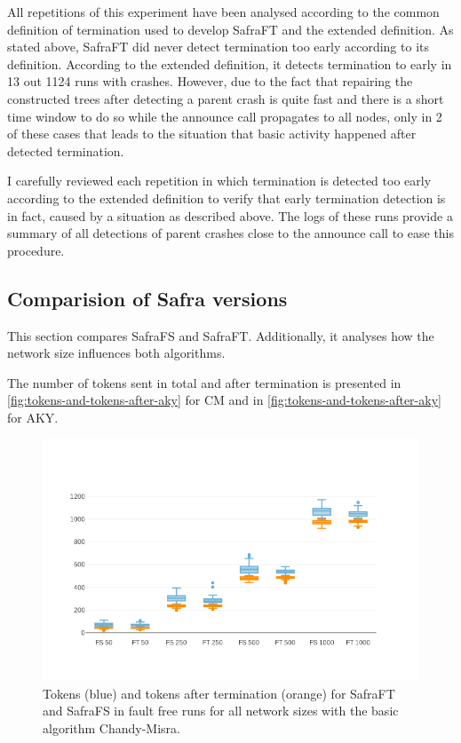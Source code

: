 All repetitions of this experiment have been analysed according to the common definition of termination used to develop SafraFT and the extended definition.
As stated above, SafraFT did never detect termination too early according to its definition.
According to the extended definition, it detects termination to early in 13 out 1124 runs with crashes.  %
However, due to the fact that repairing the constructed trees after detecting a parent crash is quite fast and there is a short time window to do so while the announce call propagates to all nodes, only in 2 of these cases that leads to the situation that basic activity happened after detected termination. %

I carefully reviewed each repetition in which termination is detected too early according to the extended definition to verify that early termination detection is in fact, caused by a situation as described above.
The logs of these runs provide a summary of all detections of parent crashes close to the announce call to ease this procedure.

\subsection{Comparision of Safra versions}
This section compares SafraFS and SafraFT.
Additionally, it analyses how the network size influences both algorithms.

The number of tokens sent in total and after termination is presented in \cref{fig:tokens-and-tokens-after-aky} for CM and in \cref{fig:tokens-and-tokens-after-aky} for AKY.

\begin{figure}
	\includegraphics{figures/tokens-cm.png}
	\caption{Tokens (blue) and tokens after termination (orange) for SafraFT and SafraFS in fault free runs for all network sizes with the basic algorithm Chandy-Misra.}
	\label{fig:tokens-and-tokens-after-cm}
\end{figure}

